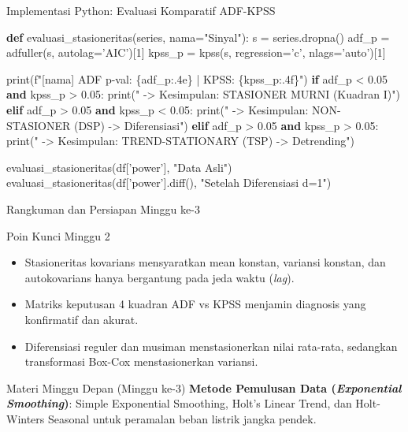 \documentclass[aspectratio=169, 10pt]{beamer}
\begin{document}
\begin{frame}[fragile]{Implementasi Python: Evaluasi Komparatif ADF-KPSS}
\begin{semiverbatim}
\color{accentblue}\textbf{def} \color{darkgray}evaluasi_stasioneritas(series, nama="Sinyal"):
    s = series.dropna()
    adf_p = adfuller(s, autolag='AIC')[1]
    kpss_p = kpss(s, regression='c', nlags='auto')[1]
    
    print(f"[{nama}] ADF p-val: \{adf_p:.4e\} | KPSS: \{kpss_p:.4f\}")
    \color{accentblue}\textbf{if} \color{darkgray}adf_p < 0.05 \color{accentblue}\textbf{and} \color{darkgray}kpss_p > 0.05:
        print(" -> Kesimpulan: STASIONER MURNI (Kuadran I)")
    \color{accentblue}\textbf{elif} \color{darkgray}adf_p > 0.05 \color{accentblue}\textbf{and} \color{darkgray}kpss_p < 0.05:
        print(" -> Kesimpulan: NON-STASIONER (DSP) -> Diferensiasi")
    \color{accentblue}\textbf{elif} \color{darkgray}adf_p > 0.05 \color{accentblue}\textbf{and} \color{darkgray}kpss_p > 0.05:
        print(" -> Kesimpulan: TREND-STATIONARY (TSP) -> Detrending")

evaluasi_stasioneritas(df['power'], "Data Asli")
evaluasi_stasioneritas(df['power'].diff(), "Setelah Diferensiasi d=1")
\end{semiverbatim}
\end{frame}

\begin{frame}{Rangkuman dan Persiapan Minggu ke-3}
    \begin{block}{Poin Kunci Minggu 2}
        \begin{itemize}
            \item Stasioneritas kovarians mensyaratkan mean konstan, variansi konstan, dan autokovarians hanya bergantung pada jeda waktu (\textit{lag}).
            \item Matriks keputusan 4 kuadran ADF vs KPSS menjamin diagnosis yang konfirmatif dan akurat.
            \item Diferensiasi reguler dan musiman menstasionerkan nilai rata-rata, sedangkan transformasi Box-Cox menstasionerkan variansi.
        \end{itemize}
    \end{block}
    \vspace{0.2cm}
    \begin{alertblock}{Materi Minggu Depan (Minggu ke-3)}
        \textbf{Metode Pemulusan Data (\textit{Exponential Smoothing})}: Simple Exponential Smoothing, Holt's Linear Trend, dan Holt-Winters Seasonal untuk peramalan beban listrik jangka pendek.
    \end{alertblock}
\end{frame}
\end{document}
